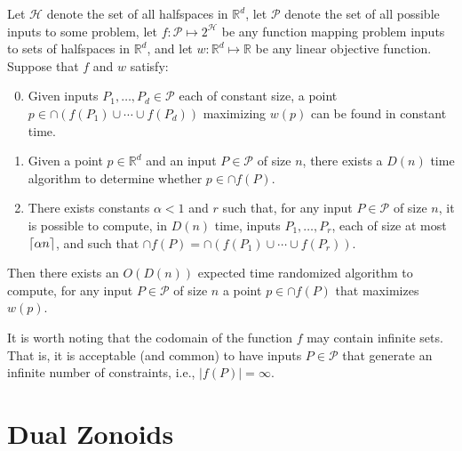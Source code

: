 \documentclass[lotsofwhite]{patmorin}
\newcommand{\R}{\mathbb{R}}
\begin{document}
\begin{thm}[Chan 2004]
Let $\mathcal{H}$ denote the set of all halfspaces in $\R^d$,
let $\mathcal{P}$ denote the set of all possible inputs to some problem, 
let $f:\mathcal{P}\mapsto 2^{\mathcal{H}}$ be any function mapping 
problem inputs to sets of halfspaces in $\R^d$,
and let $w:\R^d\mapsto \R$ be
any linear objective function.  Suppose that $f$ and $w$ satisfy:
\begin{enumerate}
\setcounter{enumi}{-1}
\item Given inputs $P_1,\ldots,P_d\in\mathcal{P}$ each of constant
size, a point $p\in\cap (f(P_1)\cup\cdots\cup f(P_d))$ maximizing
$w(p)$ can be found in constant time.

\item Given a point $p\in\R^d$ and an input $P\in\mathcal{P}$
of size $n$, there exists a $D(n)$ time algorithm to determine whether
$p\in\cap f(P)$.

\item There exists constants $\alpha < 1$ and $r$ such that, for any
input $P\in\mathcal{P}$ of size $n$, it is possible to compute, in
$D(n)$ time, inputs $P_1,\ldots,P_r$, each of size at most
$\left\lceil \alpha n \right\rceil$, and such that $\cap f(P) =
\cap(f(P_1)\cup\cdots\cup f(P_r))$.

\end{enumerate}
Then there exists an $O(D(n))$ expected time randomized algorithm to
compute, for any input $P\in\mathcal{P}$ of size $n$ a point
$p\in\cap f(P)$ that maximizes $w(p)$.
\end{thm}

It is worth noting that the codomain of the function $f$ may contain
infinite sets.  That is, it is acceptable (and common) to have inputs
$P\in\mathcal{P}$ that generate an infinite number of constraints,
i.e., $|f(P)|=\infty$.


\section{Dual Zonoids}
\end{document}
